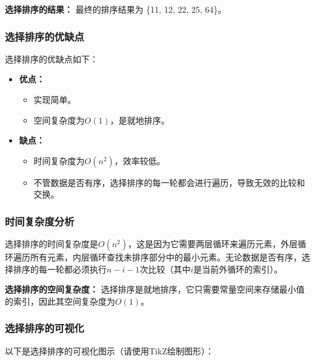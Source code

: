 \documentclass{article}
\begin{document}
\noindent
\textbf{选择排序的结果：}
最终的排序结果为 \{11, 12, 22, 25, 64\}。

\subsubsection{选择排序的优缺点}
选择排序的优缺点如下：

\begin{itemize}
    \item \textbf{优点：}
    \begin{itemize}
        \item 实现简单。
        \item 空间复杂度为$O(1)$，是就地排序。
    \end{itemize}
    \item \textbf{缺点：}
    \begin{itemize}
        \item 时间复杂度为$O(n^2)$，效率较低。
        \item 不管数据是否有序，选择排序的每一轮都会进行遍历，导致无效的比较和交换。
    \end{itemize}
\end{itemize}

\subsubsection{时间复杂度分析}
选择排序的时间复杂度是$O(n^2)$，这是因为它需要两层循环来遍历元素，外层循环遍历所有元素，内层循环查找未排序部分中的最小元素。无论数据是否有序，选择排序的每一轮都必须执行$n-i-1$次比较（其中$i$是当前外循环的索引）。

\noindent
\textbf{选择排序的空间复杂度：}
选择排序是就地排序，它只需要常量空间来存储最小值的索引，因此其空间复杂度为$O(1)$。

\subsubsection{选择排序的可视化}
以下是选择排序的可视化图示（请使用TikZ绘制图形）：

\end{document}

